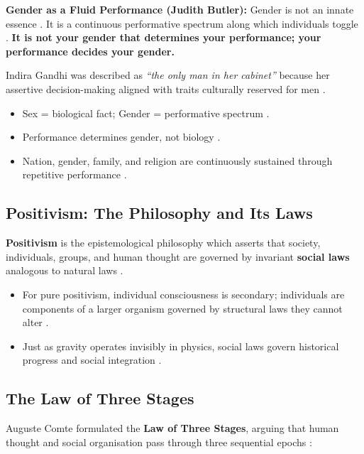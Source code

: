 \begin{KeyConcept}
\textbf{Gender as a Fluid Performance (Judith Butler):}
Gender is not an innate essence . It is a continuous performative spectrum along which individuals toggle . \textbf{It is not your gender that determines your performance; your performance decides your gender.} 
\end{KeyConcept}

\begin{ExampleBox}
Indira Gandhi was described as \textit{``the only man in her cabinet''} because her assertive decision-making aligned with traits culturally reserved for men .
\end{ExampleBox}

\begin{QuickRevision}
\begin{itemize}
    \item Sex = biological fact; Gender = performative spectrum .
    \item Performance determines gender, not biology .
    \item Nation, gender, family, and religion are continuously sustained through repetitive performance .
\end{itemize}
\end{QuickRevision}

\subsection{Positivism: The Philosophy and Its Laws}

\begin{KeyConcept}
\textbf{Positivism} is the epistemological philosophy which asserts that society, individuals, groups, and human thought are governed by invariant \textbf{social laws} analogous to natural laws .
\begin{itemize}
    \item For pure positivism, individual consciousness is secondary; individuals are components of a larger organism governed by structural laws they cannot alter .
    \item Just as gravity operates invisibly in physics, social laws govern historical progress and social integration .
\end{itemize}
\end{KeyConcept}

\subsection{The Law of Three Stages}
Auguste Comte formulated the \textbf{Law of Three Stages}, arguing that human thought and social organisation pass through three sequential epochs :

